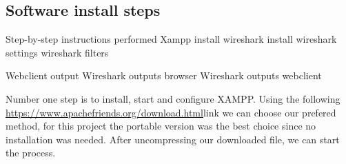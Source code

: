 \documentclass[11pt,a4paper]{report}
\begin{document}
    \subsection{Software install steps}
        Step-by-step instructions performed
        Xampp install
        wireshark install
        wireshark settings
        wireshark filters

        Webclient output
        Wireshark outputs browser
        Wireshark outputs webclient

        Number one step is to install, start and configure XAMPP. Using the following \url{https://www.apachefriends.org/download.html}{link} we can choose our prefered
        method, for this project the portable version was the best choice since no installation was needed.
        After uncompressing our downloaded file, we can start the process.
\end{document}
